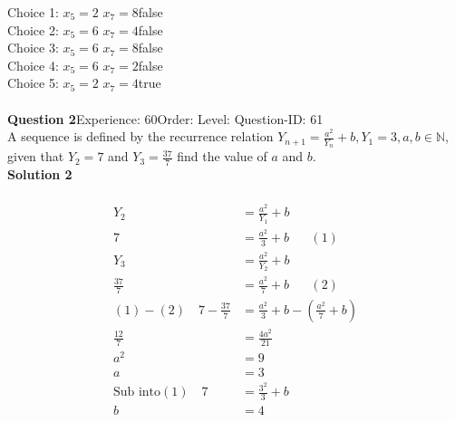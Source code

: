\documentclass{article}
\begin{document}
Choice 1: \hspace{20pt}$x_5=2 \,\, x_7=8$\hspace{20pt}false\\
Choice 2: \hspace{20pt}$x_5=6 \,\, x_7=4$\hspace{20pt}false\\
Choice 3: \hspace{20pt}$x_5=6 \,\, x_7=8$\hspace{20pt}false\\
Choice 4: \hspace{20pt}$x_5=6 \,\, x_7=2$\hspace{20pt}false\\
Choice 5: \hspace{20pt}$x_5=2 \,\, x_7=4$\hspace{20pt}true\\
\\[4pt]
\noindent\textbf{Question 2}\hspace{20pt}Experience: 60\hspace{20pt}Order: \hspace{20pt}Level: \hspace{20pt}Question-ID: 61\\[2pt]
A sequence is defined by the recurrence relation $Y_{n+1}=\displaystyle\frac{a^2}{Y_n}+b, Y_1=3, a,b \in \mathbb{N}$, given that $Y_2=7$ and $Y_3=\displaystyle\frac{37}{7}$ find the value of $a$ and $b$.\\[4pt]
\noindent\textbf{Solution 2}\\[2pt]
\\[-35pt]\begin{align*}
Y_2&=\displaystyle\frac{a^2}{Y_1}+b\\[2pt]
7&=\displaystyle\frac{a^2}{3}+b\hspace{20pt}(1)\\[12pt]
Y_3&=\displaystyle\frac{a^2}{Y_2}+b\\[2pt]
\displaystyle\frac{37}{7}&=\displaystyle\frac{a^2}{7}+b\hspace{20pt}(2)\\[2pt]
(1)-(2)\quad 7-\displaystyle\frac{37}{7}&=\frac{a^2}{3}+b-\left(\frac{a^2}{7}+b\right)\\[2pt]
\displaystyle\frac{12}{7}&=\displaystyle\frac{4a^2}{21}\\[2pt]
a^2&=9\\[2pt]
a&=3\\[12pt]
\text{Sub into} (1)\quad 7&=\displaystyle\frac{3^2}{3}+b\\[2pt]
b&=4
\end{align*}
\end{document}
